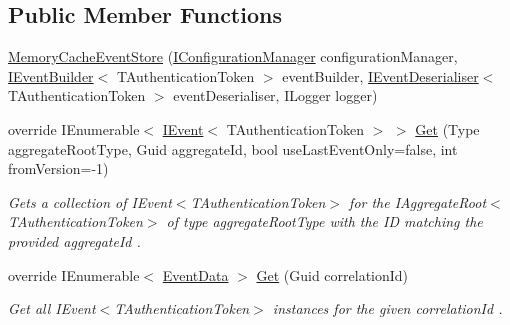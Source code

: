 \subsection*{Public Member Functions}
\begin{DoxyCompactItemize}
\item 
\hyperlink{classCqrs_1_1Events_1_1MemoryCacheEventStore_a4de9139e05d35cb62ba295569a1dc94f_a4de9139e05d35cb62ba295569a1dc94f}{Memory\+Cache\+Event\+Store} (\hyperlink{interfaceCqrs_1_1Configuration_1_1IConfigurationManager}{I\+Configuration\+Manager} configuration\+Manager, \hyperlink{interfaceCqrs_1_1Events_1_1IEventBuilder}{I\+Event\+Builder}$<$ T\+Authentication\+Token $>$ event\+Builder, \hyperlink{interfaceCqrs_1_1Events_1_1IEventDeserialiser}{I\+Event\+Deserialiser}$<$ T\+Authentication\+Token $>$ event\+Deserialiser, I\+Logger logger)
\item 
override I\+Enumerable$<$ \hyperlink{interfaceCqrs_1_1Events_1_1IEvent}{I\+Event}$<$ T\+Authentication\+Token $>$ $>$ \hyperlink{classCqrs_1_1Events_1_1MemoryCacheEventStore_a1391c260f52f5cf18058cf88ad2d16de_a1391c260f52f5cf18058cf88ad2d16de}{Get} (Type aggregate\+Root\+Type, Guid aggregate\+Id, bool use\+Last\+Event\+Only=false, int from\+Version=-\/1)
\begin{DoxyCompactList}\small\item\em Gets a collection of I\+Event$<$\+T\+Authentication\+Token$>$ for the I\+Aggregate\+Root$<$\+T\+Authentication\+Token$>$ of type {\itshape aggregate\+Root\+Type}  with the ID matching the provided {\itshape aggregate\+Id} . \end{DoxyCompactList}\item 
override I\+Enumerable$<$ \hyperlink{classCqrs_1_1Events_1_1EventData}{Event\+Data} $>$ \hyperlink{classCqrs_1_1Events_1_1MemoryCacheEventStore_a2a93a3f10423f608527fbc41a7ce8cef_a2a93a3f10423f608527fbc41a7ce8cef}{Get} (Guid correlation\+Id)
\begin{DoxyCompactList}\small\item\em Get all I\+Event$<$\+T\+Authentication\+Token$>$ instances for the given {\itshape correlation\+Id} . \end{DoxyCompactList}\end{DoxyCompactItemize}
